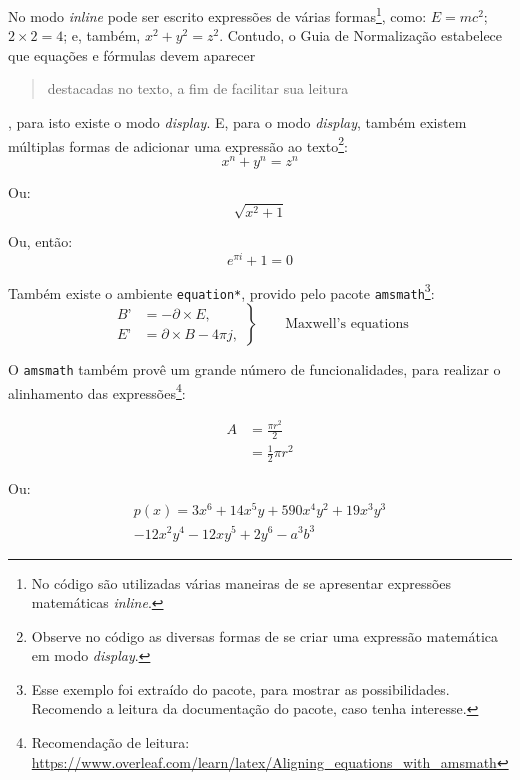   No modo \textit{inline} pode ser escrito expressões de várias formas\footnote{No código são utilizadas várias maneiras de se apresentar expressões matemáticas \textit{inline}.}, como: \(E=mc^2\); $ 2 \times 2 = 4 $; e, também, \begin{math} x^2 + y^2 = z^2 \end{math}. Contudo, o Guia de Normalização estabelece que equações e fórmulas devem aparecer \blockcquote[p. 23]{livro:iffar-guia-normalizacao-2022}{destacadas no texto, a fim de facilitar sua leitura}, para isto existe o modo \textit{display}. E, para o modo \textit{display}, também existem múltiplas formas de adicionar uma expressão ao texto\footnote{Observe no código as diversas formas de se criar uma expressão matemática em modo \textit{display}.}:
  \[ x^n + y^n = z^n \]
  
  Ou:
  \begin{displaymath}
    \sqrt{x^2+1}
  \end{displaymath}
  
  Ou, então:
  \begin{equation}
    e^{\pi i} + 1 = 0
  \end{equation}

  Também existe o ambiente \texttt{equation*}, provido pelo pacote \texttt{amsmath}\footnote{Esse exemplo foi extraído do pacote, para mostrar as possibilidades. Recomendo a leitura da documentação do pacote, caso tenha interesse.}:
  \begin{equation*}
    \left.\begin{aligned}
    B’&=-\partial\times E,\\
    E’&=\partial\times B - 4\pi j,
    \end{aligned}
    \right\}
    \qquad \text{Maxwell’s equations}
  \end{equation*}

  O \texttt{amsmath} também provê um grande número de funcionalidades, para realizar o alinhamento das expressões\footnote{Recomendação de leitura: \url{https://www.overleaf.com/learn/latex/Aligning_equations_with_amsmath}}:
  
  \begin{equation}
    \begin{split}
      A& = \frac{\pi r^2}{2} \\
       & = \frac{1}{2} \pi r^2
    \end{split}
  \end{equation}
  
  Ou:
  \begin{multline}
    p(x) = 3x^6 + 14x^5y + 590x^4y^2 + 19x^3y^3\\ 
    - 12x^2y^4 - 12xy^5 + 2y^6 - a^3b^3
  \end{multline}

